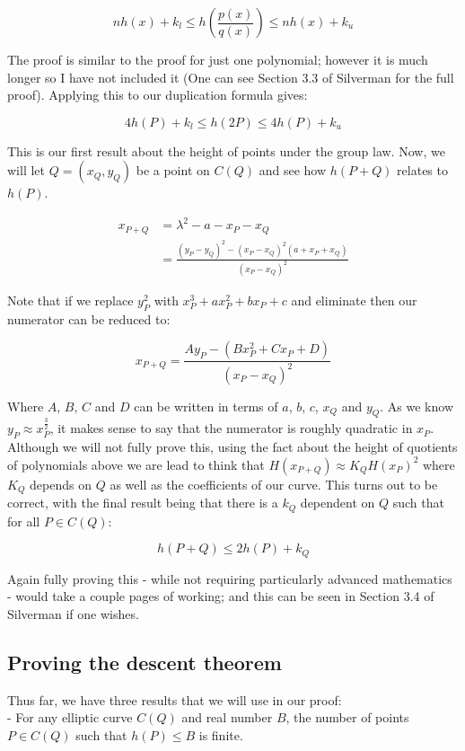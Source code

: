 \documentclass{article}
\begin{document}
\[n h(x) + k_l \leq h \left( \frac{p(x)}{q(x)} \right) \leq n h(x) + k_u \]

The proof is similar to the proof for just one polynomial; however it is much longer so I have not included it (One can see Section 3.3 of Silverman for the full proof). Applying this to our duplication formula gives:

\[4h(P) + k_l \leq h(2P) \leq 4 h(P) + k_u\]

This is our first result about the height of points under the group law. Now, we will let $Q = (x_Q, y_Q)$ be a point on $C(Q)$ and see how $h(P + Q)$ relates to $h(P)$.

\begin{align*}
    x_{P + Q} &= \lambda^2 - a - x_P - x_Q\\
              &= \frac{(y_P - y_Q)^2 - (x_P - x_Q)^2(a + x_P + x_Q)}{(x_P - x_Q)^2}
\end{align*}

Note that if we replace $y_P^2$ with $x_P^3 + a x_P ^2 + b x_P + c$ and eliminate then our numerator can be reduced to:

\[x_{P + Q} = \frac{A y_P - (B x_P^2 + C x_P + D)}{(x_P - x_Q)^2}\]

Where $A$, $B$, $C$ and $D$ can be written in terms of $a$, $b$, $c$, $x_Q$ and $y_Q$. As we know $y_P \approx x_P^{\frac{3}{2}}$, it makes sense to say that the numerator is roughly quadratic in $x_P$. Although we will not fully prove this, using the fact about the height of quotients of polynomials above we are lead to think that $H(x_{P+Q}) \approx K_Q H(x_P)^2$ where $K_Q$ depends on $Q$ as well as the coefficients of our curve. This turns out to be correct, with the final result being that there is a $k_Q$ dependent on $Q$ such that for all $P \in C(Q)$:

\[h(P + Q) \leq 2h(P) + k_Q\]

Again fully proving this - while not requiring particularly advanced mathematics - would take a couple pages of working; and this can be seen in Section 3.4 of Silverman if one wishes.

\subsection{Proving the descent theorem}

Thus far, we have three results that we will use in our proof:\\

- For any elliptic curve $C(Q)$ and  real number $B$, the number of points $P \in C(Q)$ such that $h(P) \leq B$ is finite.\\
\end{document}

